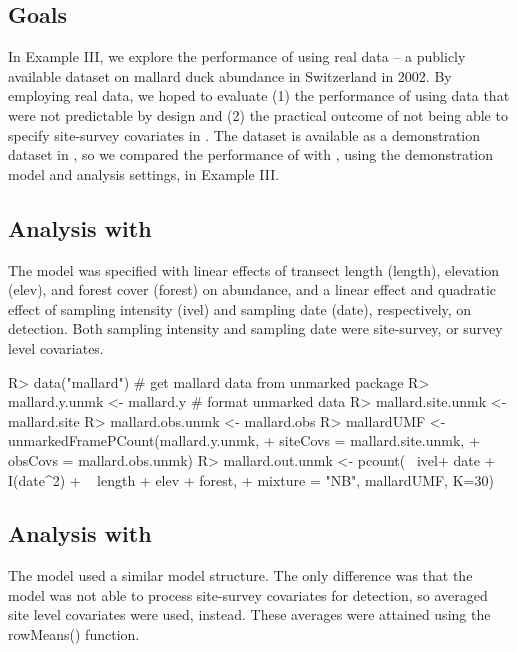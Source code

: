 \documentclass[article]{jss}
\begin{document}
\subsection[Goals]{Goals}
In Example III, we explore the performance of  using real data -- a publicly available dataset on mallard duck abundance in Switzerland in 2002. By employing real data, we hoped to evaluate (1) the performance of  using data that were not predictable by design and (2) the practical outcome of not being able to specify site-survey covariates in . The dataset is available as a demonstration dataset in , so we compared the performance of  with , using the demonstration model and analysis settings, in Example III.

\subsection[Analysis with unmarked]{Analysis with }
The  model was specified with linear effects of transect length (length), elevation (elev), and forest cover (forest) on abundance, and a linear effect and quadratic effect of sampling intensity (ivel) and sampling date (date), respectively, on detection. Both sampling intensity and sampling date were site-survey, or survey level covariates.

\begin{CodeInput}
R> data("mallard") # get mallard data from unmarked package
R> mallard.y.unmk <- mallard.y # format unmarked data
R> mallard.site.unmk <- mallard.site
R> mallard.obs.unmk <- mallard.obs
R> mallardUMF <- unmarkedFramePCount(mallard.y.unmk, 
+                                    siteCovs = mallard.site.unmk,
+                                    obsCovs = mallard.obs.unmk)
R> mallard.out.unmk <- pcount(~ ivel+ date + I(date^2)
+                             ~ length + elev + forest,
+                               mixture = "NB", mallardUMF, K=30) 
\end{CodeInput}

\subsection[Analysis with R-INLA]{Analysis with }
The  model used a similar model structure. The only difference was that the  model was not able to process site-survey covariates for detection, so averaged site level covariates were used, instead. These averages were attained using the rowMeans() function.
\end{document}
